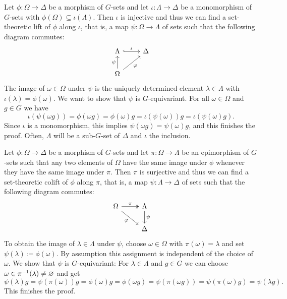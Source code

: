 \begin{rem}\label{rem:lifts_along_monomorphisms_in_G_sets}
Let $\phi\colon \Omega \to \Delta$ be a morphism of $G$-sets and let $\iota\colon \Lambda \to \Delta$ be a monomorphism of $G$-sets with $\phi(\Omega) \subseteq \iota(\Lambda)$. Then $\iota$ is injective and thus we can find a set-theoretic lift of $\phi$ along $\iota$, that is, a map $\psi\colon \Omega \to \Lambda$ of sets such that the following diagram commutes:
\[
\begin{tikzcd}
\Lambda \arrow[r, "\iota", hook]             & \Delta \\
\Omega \arrow[ru, "\phi"'] \arrow[u, "\psi"] &       
\end{tikzcd}
\]
The image of $\omega \in \Omega$ under $\psi$ is the uniquely determined element $\lambda \in \Lambda$ with $\iota(\lambda) = \phi(\omega)$. We want to show that $\psi$ is $G$-equivariant. For all $\omega \in \Omega$ and $g \in G$ we have \[\iota(\psi(\omega g)) = \phi(\omega g) = \phi(\omega)g = \iota(\psi(\omega))g = \iota(\psi(\omega)g).\] Since $\iota$ is a monomorphism, this implies $\psi(\omega g) = \psi(\omega)g$, and this finishes the proof.
Often, $\Lambda$ will be a sub-$G$-set of $\Delta$ and $\iota$ the inclusion.
\end{rem}

\begin{rem}\label{rem:colifts_along_epimorphisms_in_G_sets}
Let $\phi\colon \Omega \to \Delta$ be a morphism of $G$-sets and let $\pi\colon \Omega \to \Lambda$ be an epimorphism of $G$-sets such that any two elements of $\Omega$ have the same image under $\phi$ whenever they have the same image under $\pi$. Then $\pi$ is surjective and thus we can find a set-theoretic colift of $\phi$ along $\pi$, that is, a map $\psi\colon \Lambda \to \Delta$ of sets such that the following diagram commutes:
\[
\begin{tikzcd}
\Omega \arrow[r, "\pi", two heads] \arrow[rd, "\phi"'] & \Lambda \arrow[d, "\psi"] \\
                                                       & \Delta                   
\end{tikzcd}
\]
To obtain the image of $\lambda \in \Lambda$ under $\psi$, choose $\omega \in \Omega$ with $\pi(\omega) = \lambda$ and set $\psi(\lambda) \coloneqq \phi(\omega)$. By assumption this assignment is independent of the choice of $\omega$. We show that $\psi$ is $G$-equivariant: For $\lambda \in \Lambda$ and $g \in G$ we can choose $\omega \in \pi^{-1}(\lambda) \neq \varnothing$ and get \[\psi(\lambda)g = \psi(\pi(\omega))g = \phi(\omega)g = \phi(\omega g) = \psi(\pi(\omega g)) = \psi(\pi(\omega) g) = \psi(\lambda g).\] This finishes the proof.
\end{rem}

